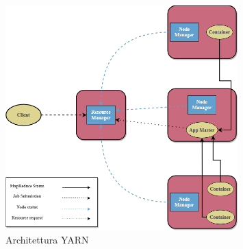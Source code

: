 \begin{figure}[ht!]
    \centering
    \includegraphics[width=0.8\textwidth]{img/yarn.png}
    \caption{Architettura YARN}
    \label{fig:yarn}
\end{figure}
\clearpage